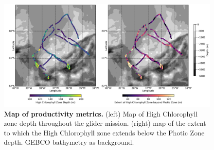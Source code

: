 \documentclass[
	a4paper, %
	10pt, %
	unnumberedsections, %
	twoside, %
]{LTJournalArticle}
\begin{document}
\begin{figure}[H] 
	\includegraphics[width=\linewidth]{Louis/figures/figureK.png}
	\caption{\textbf{Map of productivity metrics.} (left) Map of High Chlorophyll zone depth throughout the glider mission. (right) map of the extent to which the High Chlorophyll zone extends below the Photic Zone depth. GEBCO bathymetry as background.}
	\label{fig:K}
\end{figure}
\end{document}
